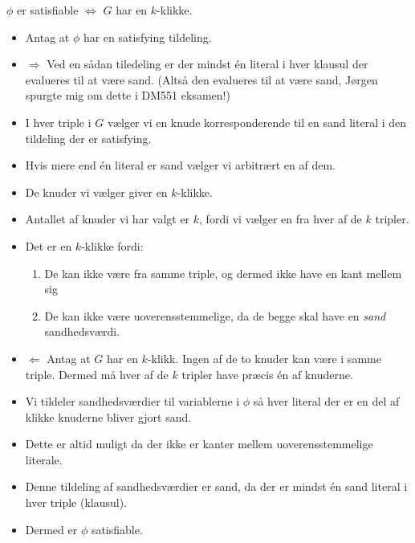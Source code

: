 \begin{frame}[allowframebreaks]
	\begin{theorem}
		$\phi$  er satisfiable $\iff$ $G$ har en $k$-klikke.
	\end{theorem}

	\begin{itemize}
		\item Antag at $\phi$ har en satisfying tildeling.
		\item \(\Rightarrow\) Ved en sådan tiledeling er der mindst én literal i hver klausul der evalueres til at være sand. (Altså den evalueres til at være sand, Jørgen spurgte mig om dette i DM551 eksamen!)
		\item I hver triple i $G$ vælger vi en knude korresponderende til en sand literal i den tildeling der er satisfying.
		\item Hvis mere end én literal er sand vælger vi arbitrært en af dem.
		\item De knuder vi vælger giver en $k$-klikke.
		\item Antallet af knuder vi har valgt er $k$, fordi vi vælger en fra hver af de $k$ tripler.
		\item Det er en $k$-klikke fordi:
		      \begin{enumerate}
			      \item De kan ikke være fra samme triple, og dermed ikke have en kant mellem sig
			      \item De kan ikke være uoverensstemmelige, da de begge skal have en \textit{sand} sandhedsværdi.
		      \end{enumerate}
		\item \(\Leftarrow\) Antag at $G$ har en $k$-klikk. Ingen af de to knuder kan være i samme triple. Dermed må hver af de $k$ tripler have præcis én af knuderne.
		\item Vi tildeler sandhedsværdier til variablerne i $\phi$ så hver literal  der er en del af klikke knuderne bliver gjort sand.
		\item Dette er altid muligt da der ikke er kanter mellem uoverensstemmelige literale.
		\item Denne tildeling af sandhedsværdier er sand, da der er mindst én sand literal i hver triple (klausul).
		\item Dermed er $\phi$ satisfiable.
	\end{itemize}
\end{frame}

